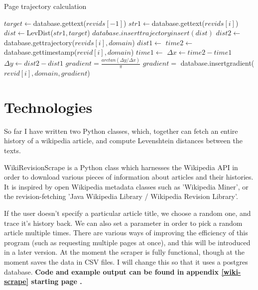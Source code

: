 \begin{algorithm}
\caption{Page trajectory calculation}\label{traj-calc}
  \begin{algorithmic}
    \State $target \gets $database.gettext($revids[-1]$)
    \State $str1 \gets $database.gettext($revids[i]$)
    \State $dist \gets $LevDist($str1, target$)
    \State $database.inserttrajectoryinsert(dist)$    
    \EndIf
    \EndFor
    \State $dist2 \gets $database.gettrajectory($revids[i],domain$)
    \State $dist1 \gets$
    \State $time2 \gets $database.gettimestamp($revid[i],domain$)
    \State $time1 \gets $
    \State ${\Delta}x \gets time2 - time1$
    \State ${\Delta}y \gets dist2 - dist1$
    \State $gradient = \frac{arctan({\Delta}y/{\Delta}x)}{\pi}$ 
    \State $gradient = $
    \EndIf
    \State database.insertgradient($revid[i],domain,gradient$)
    \EndFor
    \EndProcedure
  \end{algorithmic}
\end{algorithm}


\section{Technologies}
So far I have written two Python classes, which, together can fetch an
entire history of a wikipedia article, and compute Levenshtein
distances between the texts.

WikiRevisionScrape is a Python class which harnesses the Wikipedia API
in order to download various pieces of information about articles and
their histories. It is inspired by open Wikipedia metadata classes
such as 'Wikipedia Miner'\cite{wiki-miner}, or the revision-fetching
'Java Wikipedia Library / Wikipedia Revision
Library'.\cite{wiki-java}\cite{Ferschke2011}

If the user doesn't specify a particular article title, we choose a
random one, and trace it's history back. We can also set a parameter
in order to pick a random article multiple times. There are various
ways of improving the efficiency of this program (such as requesting
multiple pages at once), and this will be introduced in a later
version. At the moment the scraper is fully functional, though at the
moment saves the data in CSV files. I will change this so that it uses
a postgres database. \textbf{Code and example output can be found in
  appendix \ref{wiki-scrape} starting page \pageref{wiki-scrape}.}

